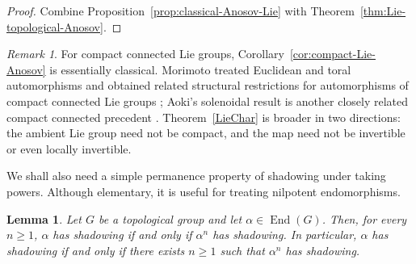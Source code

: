 \documentclass[12pt]{amsart}
\newtheorem{lemma}[theorem]{Lemma}
\theoremstyle{definition}
\numberwithin{equation}{section}
\theoremstyle{remark}
\newtheorem{remark}[theorem]{Remark}
\begin{document}
\begin{proof}
Combine Proposition~\ref{prop:classical-Anosov-Lie} with
Theorem~\ref{thm:Lie-topological-Anosov}.
\end{proof}

\begin{remark}
For compact connected Lie groups, Corollary~\ref{cor:compact-Lie-Anosov}
is essentially classical. Morimoto treated Euclidean and toral
automorphisms and obtained related structural restrictions for
automorphisms of compact connected Lie groups \cite{Morimoto1981}; Aoki's
solenoidal result is another closely related compact connected precedent
\cite[Theorem~2]{AokiSolenoidal1983}. Theorem~\ref{LieChar} is broader in two
directions: the ambient Lie group need not be compact, and the map need not
be invertible or even locally invertible.
\end{remark}

We shall also need a simple permanence property of shadowing under taking powers. Although elementary, it is useful for treating nilpotent endomorphisms.

\begin{lemma}\label{powern}
	Let $G$ be a topological group and let $\alpha\in\operatorname{End}(G)$.
	Then, for every $n\geq 1$, $\alpha$ has shadowing if and only if
	$\alpha^n$ has shadowing. In particular, $\alpha$ has shadowing if and only
	if there exists $n\geq 1$ such that $\alpha^n$ has shadowing.
\end{lemma}
\end{document}
